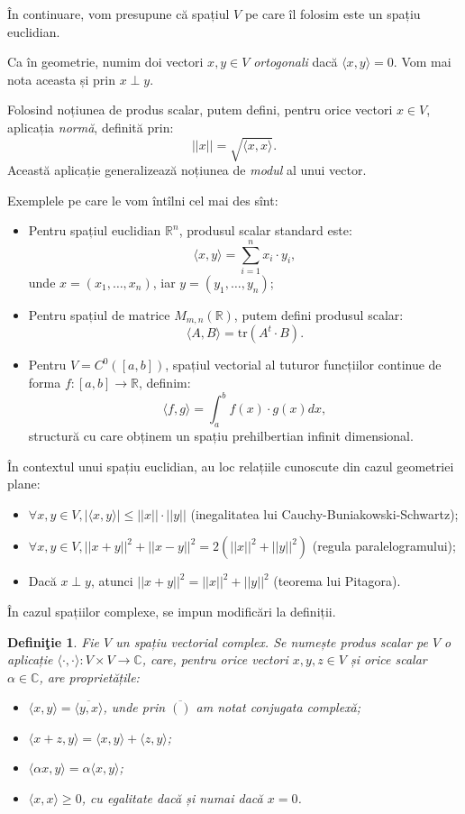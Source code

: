\documentclass[11pt,a4paper]{article}
\newcommand\RR{\mathbb{R}}
\newcommand\CC{\mathbb{C}}
\theoremstyle{dotless}
\theoremstyle{dotlessdr}
\newtheorem{definition}{Defini\c{t}ie}[section]
\begin{document}
În continuare, vom presupune că spațiul $V$ pe care îl folosim este un spațiu
euclidian.

Ca în geometrie, numim doi vectori $x, y \in V$ \emph{ortogonali} dacă
$\langle x, y \rangle = 0$. Vom mai nota aceasta și prin $x \perp y$.

Folosind noțiunea de produs scalar, putem defini, pentru orice vectori $x \in V$,
aplicația \emph{normă}, definită prin:
\[
  || x || = \sqrt{ \langle x, x \rangle }.
\]
Această aplicație generalizează noțiunea de \emph{modul} al unui vector.

Exemplele pe care le vom întîlni cel mai des sînt:
\begin{itemize}
\item Pentru spațiul euclidian $\RR^n$, produsul scalar standard este:
  \[
    \langle x, y \rangle = \sum_{i = 1}^n x_i \cdot y_i,
  \]
  unde $x = (x_1, \dots, x_n)$, iar $y = (y_1, \dots, y_n)$;
\item Pentru spațiul de matrice $M_{m,n}(\RR)$, putem defini produsul scalar:
  \[
    \langle A, B \rangle = \mathrm{tr}(A^t \cdot B).
  \]
\item Pentru $V = C^0([a, b])$, spațiul vectorial al tuturor funcțiilor continue
  de forma $f : [a, b] \to \RR$, definim:
  \[
    \langle f, g \rangle = \int_a^b f(x) \cdot g(x) dx,
  \]
  structură cu care obținem un spațiu prehilbertian infinit dimensional.
\end{itemize}

În contextul unui spațiu euclidian, au loc relațiile cunoscute din cazul
geometriei plane:
\begin{itemize}
\item $\forall x,y \in V, |\langle x, y \rangle| \leq ||x|| \cdot ||y||$ (inegalitatea
  lui Cauchy-Buniakowski-Schwartz);
\item $\forall x, y \in V, ||x + y||^2 + ||x - y||^2 = 2(||x||^2 + ||y||^2)$ (regula %
  paralelogramului);
\item Dacă $x \perp y$, atunci $||x + y||^2 = ||x||^2 + ||y||^2$ (teorema lui Pitagora).
\end{itemize}

În cazul spațiilor complexe, se impun modificări la definiții.

\begin{definition}\label{def:prod-sc-compl}
  Fie $V$ un spațiu vectorial complex. Se numește \emph{produs scalar} pe $V$
  o aplicație $\langle \cdot, \cdot \rangle : V \times V \to \CC$,
  care, pentru orice vectori $x, y, z \in V$ și orice scalar $\alpha \in \CC$,
  are proprietățile:
  \begin{itemize}
  \item $\langle x, y \rangle = \overline{\langle y, x \rangle}$, unde prin $\overline{()}$
    am notat conjugata complexă;
  \item $\langle x + z, y \rangle = \langle x, y \rangle + \langle z, y \rangle$;
  \item $\langle \alpha x, y \rangle = \alpha \langle x, y \rangle$;
  \item $\langle x, x \rangle \geq 0$, cu egalitate dacă și numai dacă $x = 0$.
  \end{itemize}
\end{definition}
\end{document}
